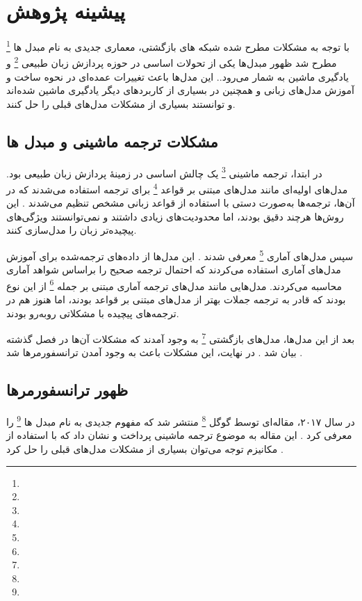 \chapter{پیشینه پژوهش}


با توجه به مشکلات مطرح شده شبکه های بازگشتی، معماری جدیدی به نام مبدل ها \footnote{} مطرح شد 
ظهور مبدل‌ها یکی از تحولات اساسی در حوزه پردازش زبان طبیعی \footnote{} و یادگیری ماشین به شمار می‌رود.\cite{vaswani2017attention,bahdanau2014neural}. 
این مدل‌ها باعث تغییرات عمده‌ای در نحوه ساخت و آموزش مدل‌های زبانی و همچنین در بسیاری از کاربردهای دیگر یادگیری ماشین شده‌اند و توانستند بسیاری از مشکلات مدل‌های قبلی را حل کنند\cite{devlin2018bert,radford2018improving}.
\section{مشکلات ترجمه ماشینی و مبدل ها}

در ابتدا، ترجمه ماشینی \footnote{} یک چالش اساسی در زمینهٔ پردازش زبان طبیعی بود. مدل‌های اولیه‌ای مانند مدل‌های مبتنی بر قواعد \footnote{} برای ترجمه استفاده می‌شدند که در آن‌ها، ترجمه‌ها به‌صورت دستی با استفاده از قواعد زبانی مشخص تنظیم می‌شدند \cite{nagao1984framework,hutchins1986machine}. این روش‌ها هرچند دقیق بودند، اما محدودیت‌های زیادی داشتند و نمی‌توانستند ویژگی‌های پیچیده‌تر زبان را مدل‌سازی کنند.



سپس مدل‌های آماری \footnote{} معرفی شدند \cite{brown1993mathematics,koehn2010statistical}. این مدل‌ها از داده‌های ترجمه‌شده برای آموزش مدل‌های آماری استفاده می‌کردند که احتمال ترجمه صحیح را براساس شواهد آماری محاسبه می‌کردند. مدل‌هایی مانند مدل‌های ترجمه آماری مبتنی بر جمله \footnote{} \cite{koehn2003statistical} از این نوع بودند که قادر به ترجمه جملات بهتر از مدل‌های مبتنی بر قواعد بودند، اما هنوز هم در ترجمه‌های پیچیده با مشکلاتی روبه‌رو بودند.



بعد از این مدل‌ها، مدل‌های بازگشتی \footnote{} به وجود آمدند که مشکلات آن‌ها در فصل گذشته بیان شد \cite{elman1990finding,sutskever2014sequence}. در نهایت، این مشکلات باعث به وجود آمدن ترانسفورمرها شد \cite{bahdanau2014neural}.




\section{ظهور ترانسفورمرها}
در سال ۲۰۱۷، مقاله‌ای توسط گوگل \footnote{} منتشر شد که مفهوم جدیدی به نام مبدل ها \footnote{} را معرفی کرد \cite{vaswani2017attention}. این مقاله به موضوع ترجمه ماشینی پرداخت و نشان داد که با استفاده از مکانیزم توجه می‌توان بسیاری از مشکلات مدل‌های قبلی را حل کرد \cite{luong2015effective}.

